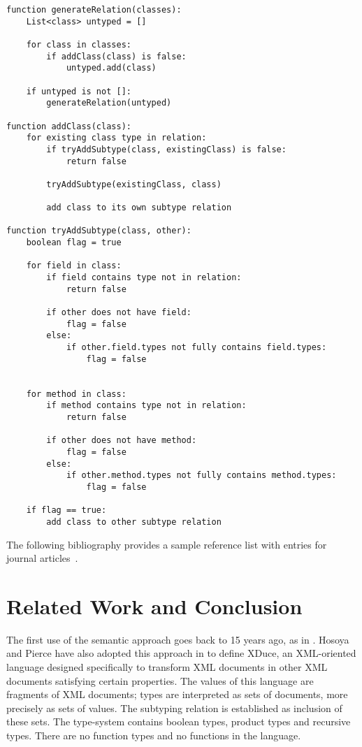 \documentclass[runningheads]{llncs}
\begin{document}
\begin{verbatim}
function generateRelation(classes):
    List<class> untyped = []

    for class in classes:
        if addClass(class) is false:
            untyped.add(class)
    
    if untyped is not []:
        generateRelation(untyped)

function addClass(class):
    for existing class type in relation:
        if tryAddSubtype(class, existingClass) is false:
            return false

        tryAddSubtype(existingClass, class)        

        add class to its own subtype relation

function tryAddSubtype(class, other):
    boolean flag = true

    for field in class:
        if field contains type not in relation:
            return false

        if other does not have field:
            flag = false
        else:
            if other.field.types not fully contains field.types:
                flag = false 


    for method in class:
        if method contains type not in relation:
            return false

        if other does not have method:
            flag = false
        else:
            if other.method.types not fully contains method.types:
                flag = false

    if flag == true:
        add class to other subtype relation
\end{verbatim}

The following bibliography provides
a sample reference list with entries for journal
articles~\cite{Dardha2017}.

\section{Related Work and Conclusion}
The first use of the semantic approach goes back to 15 years ago, as in \cite{Aiken,Damm}. Hosoya and Pierce have also adopted this approach in \cite{XML1,XML2,XML3} to define XDuce, an XML-oriented language designed specifically to transform XML documents in other XML documents satisfying certain properties. The values of this language are fragments of XML documents; types are interpreted as sets of documents, more precisely as sets of values. The subtyping relation is established as inclusion of these sets. The type-system contains boolean types, product types and recursive types. There are no function types and no functions in the language.
\end{document}
